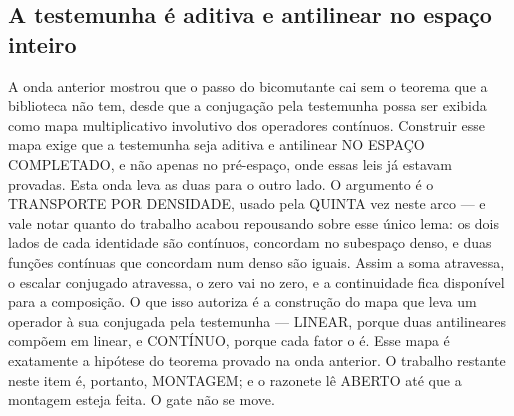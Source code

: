 \documentclass[11pt]{article}
\theoremstyle{definition}\newtheorem{deriv}{Derivação}
\begin{document}
\subsection*{A testemunha \'e aditiva e antilinear no espa\c{c}o inteiro}A onda anterior mostrou que o passo do bicomutante cai sem o teorema que a biblioteca n\~ao tem, desde que a conjuga\c{c}\~ao pela testemunha possa ser exibida como mapa multiplicativo involutivo dos operadores cont\'inuos. Construir esse mapa exige que a testemunha seja aditiva e antilinear NO ESPA\c{C}O COMPLETADO, e n\~ao apenas no pr\'e-espa\c{c}o, onde essas leis j\'a estavam provadas. Esta onda leva as duas para o outro lado. O argumento \'e o TRANSPORTE POR DENSIDADE, usado pela QUINTA vez neste arco --- e vale notar quanto do trabalho acabou repousando sobre esse \'unico lema: os dois lados de cada identidade s\~ao cont\'inuos, concordam no subespa\c{c}o denso, e duas fun\c{c}\~oes cont\'inuas que concordam num denso s\~ao iguais. Assim a soma atravessa, o escalar conjugado atravessa, o zero vai no zero, e a continuidade fica dispon\'ivel para a composi\c{c}\~ao. O que isso autoriza \'e a constru\c{c}\~ao do mapa que leva um operador \`a sua conjugada pela testemunha --- LINEAR, porque duas antilineares comp\~oem em linear, e CONT\'INUO, porque cada fator o \'e. Esse mapa \'e exatamente a hip\'otese do teorema provado na onda anterior. O trabalho restante neste item \'e, portanto, MONTAGEM; e o razonete l\^e ABERTO at\'e que a montagem esteja feita. O gate n\~ao se move.
\end{document}
